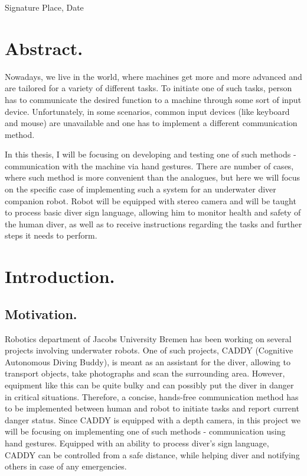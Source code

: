 \documentclass[a4paper,11pt,oneside]{article}
\begin{document}
\vspace{20mm}

Signature \hfill Place, Date

\newpage

\section*{Abstract.}

Nowadays, we live in the world, where machines get more and more advanced and are tailored for a variety of different tasks. To initiate one of such tasks, person has to communicate the desired function to a machine through some sort of input device. Unfortunately, in some scenarios, common input devices (like keyboard and mouse) are unavailable and one has to implement a different communication method.

In this thesis, I will be focusing on developing and testing one of such methods - communication with the machine via hand gestures. There are number of cases, where such method is more convenient than the analogues, but here we will focus on the specific case of implementing such a system for an underwater diver companion robot. Robot will be equipped with stereo camera and will be taught to process basic diver sign language, allowing him to monitor health and safety of the human diver, as well as to receive instructions regarding the tasks and further steps it needs to perform. 

\newpage
\tableofcontents

\clearpage
{}

\section{Introduction.}

\subsection{Motivation.}


Robotics department of Jacobs University Bremen has been working on several projects involving underwater robots. One of such projects, CADDY (Cognitive Autonomous Diving Buddy), is meant as an assistant for the diver, allowing to transport objects, take photographs and scan the surrounding area. However, equipment like this can be quite bulky and can possibly put the diver in danger in critical situations. Therefore, a concise, hands-free communication method has to be implemented between human and robot to initiate tasks and report current danger status. Since CADDY is equipped with a depth camera, in this project we will be focusing on implementing one of such methods - communication using hand gestures. Equipped with an ability to process diver's sign language, CADDY can be controlled from a safe distance, while helping diver and notifying others in case of any emergencies.
\end{document}
